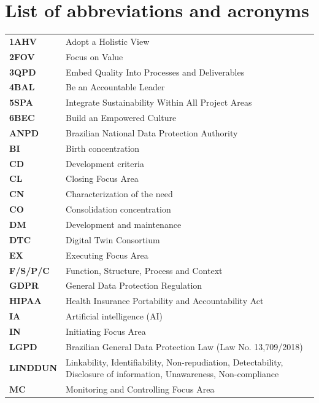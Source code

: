 \documentclass[11pt,a4paper]{article}
\begin{document}
\section*{List of abbreviations and acronyms}
\small
\begin{longtable}{@{}>{\raggedright\arraybackslash}p{2.6cm}>{\raggedright\arraybackslash}p{\dimexpr\linewidth-2.6cm-2\tabcolsep\relax}@{}}
\textbf{1AHV} & Adopt a Holistic View\\[2pt]
\textbf{2FOV} & Focus on Value\\[2pt]
\textbf{3QPD} & Embed Quality Into Processes and Deliverables\\[2pt]
\textbf{4BAL} & Be an Accountable Leader\\[2pt]
\textbf{5SPA} & Integrate Sustainability Within All Project Areas\\[2pt]
\textbf{6BEC} & Build an Empowered Culture\\[2pt]
\textbf{ANPD} & Brazilian National Data Protection Authority\\[2pt]
\textbf{BI} & Birth concentration\\[2pt]
\textbf{CD} & Development criteria\\[2pt]
\textbf{CL} & Closing Focus Area\\[2pt]
\textbf{CN} & Characterization of the need\\[2pt]
\textbf{CO} & Consolidation concentration\\[2pt]
\textbf{DM} & Development and maintenance\\[2pt]
\textbf{DTC} & Digital Twin Consortium\\[2pt]
\textbf{EX} & Executing Focus Area\\[2pt]
\textbf{F/S/P/C} & Function, Structure, Process and Context\\[2pt]
\textbf{GDPR} & General Data Protection Regulation\\[2pt]
\textbf{HIPAA} & Health Insurance Portability and Accountability Act\\[2pt]
\textbf{IA} & Artificial intelligence (AI)\\[2pt]
\textbf{IN} & Initiating Focus Area\\[2pt]
\textbf{LGPD} & Brazilian General Data Protection Law (Law No. 13,709/2018)\\[2pt]
\textbf{LINDDUN} & Linkability, Identifiability, Non-repudiation, Detectability, Disclosure of information, Unawareness, Non-compliance\\[2pt]
\textbf{MC} & Monitoring and Controlling Focus Area\\[2pt]

\end{longtable}
\end{document}
